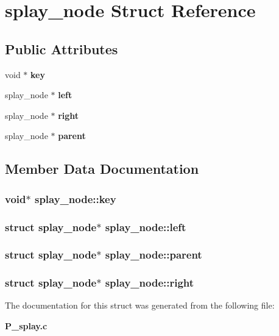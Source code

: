 \section{splay\_\-node  Struct Reference}
\label{structsplay__node}
\subsection*{Public Attributes}
\begin{CompactItemize}
\item 
void $\ast$ {\bf key}
\item 
splay\_\-node $\ast$ {\bf left}
\item 
splay\_\-node $\ast$ {\bf right}
\item 
splay\_\-node $\ast$ {\bf parent}
\end{CompactItemize}


\subsection{Member Data Documentation}
\subsubsection{\setlength{\rightskip}{0pt plus 5cm}void$\ast$ splay\_\-node::key}\label{structsplay__node_m0}


\subsubsection{\setlength{\rightskip}{0pt plus 5cm}struct splay\_\-node$\ast$ splay\_\-node::left}\label{structsplay__node_m1}


\subsubsection{\setlength{\rightskip}{0pt plus 5cm}struct splay\_\-node$\ast$ splay\_\-node::parent}\label{structsplay__node_m3}


\subsubsection{\setlength{\rightskip}{0pt plus 5cm}struct splay\_\-node$\ast$ splay\_\-node::right}\label{structsplay__node_m2}




The documentation for this struct was generated from the following file:\begin{CompactItemize}
\item 
{\bf P\_\-splay.c}\end{CompactItemize}
